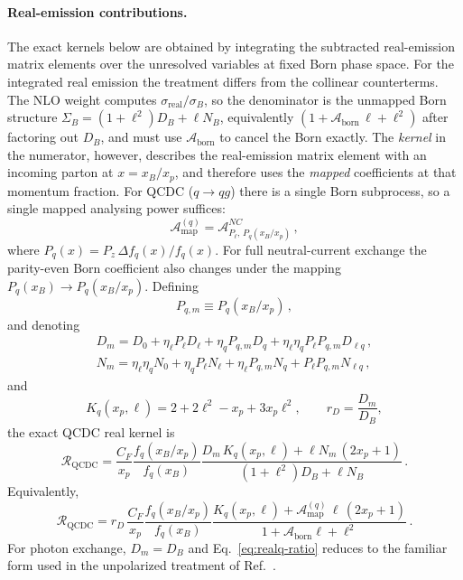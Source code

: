 \documentclass[a4paper,11pt]{article}
\begin{document}
\paragraph{Real-emission contributions.}
The exact kernels below are obtained by integrating the subtracted real-emission matrix elements over the unresolved variables at fixed Born phase space. For the integrated real emission the treatment differs from the collinear counterterms.  The NLO weight computes $\sigma_{\text{real}}/\sigma_B$, so the denominator is the unmapped Born structure $\Sigma_B=(1+\ell^2)D_B+\ell N_B$, equivalently $(1+\mathcal{A}_{\text{born}}\,\ell+\ell^2)$ after factoring out $D_B$, and must use $\mathcal{A}_{\text{born}}$ to cancel the Born exactly.  The \emph{kernel} in the numerator, however, describes the real-emission matrix element with an incoming parton at $x=x_B/x_p$, and therefore uses the \emph{mapped} coefficients at that momentum fraction.  For QCDC ($q\to qg$) there is a single Born subprocess, so a single mapped analysing power suffices:
\begin{equation}
  \mathcal{A}_{\text{map}}^{(q)} = \mathcal{A}^{NC}_{P_\ell,\,P_q(x_B/x_p)}\,,
\label{eq:a-mapped-q}
\end{equation}
where $P_q(x)=P_z\,\Delta f_q(x)/f_q(x)$.
For full neutral-current exchange the parity-even Born coefficient also changes under the mapping $P_q(x_B)\to P_q(x_B/x_p)$. Defining
\begin{equation}
  P_{q,m}\equiv P_q(x_B/x_p)\,,
\end{equation}
and denoting
\begin{align}
  D_m=D_0+\eta_\ell P_\ell D_\ell+\eta_q P_{q,m}D_q+\eta_\ell\eta_q P_\ell P_{q,m}D_{\ell q}\,,\nonumber \\
  N_m=\eta_\ell\eta_q N_0+\eta_q P_\ell N_\ell+\eta_\ell P_{q,m}N_q+P_\ell P_{q,m}N_{\ell q}\,,
\end{align}
and
\begin{equation}
  K_q(x_p,\ell)=2+2\ell^2-x_p+3x_p\ell^2,\qquad
  r_D=\frac{D_m}{D_B},
\end{equation}
the exact QCDC real kernel is
\begin{equation}
  \mathcal{R}_{\text{QCDC}}
  =
  \frac{C_F}{x_p}\frac{f_q(x_B/x_p)}{f_q(x_B)}
  \frac{D_m\,K_q(x_p,\ell)+\ell N_m\,(2x_p+1)}
       {(1+\ell^2)D_B+\ell N_B}\,.
  \label{eq:realq-exact}
\end{equation}
Equivalently,
\begin{equation}
  \mathcal{R}_{\text{QCDC}}
  =
  r_D\,
  \frac{C_F}{x_p}\frac{f_q(x_B/x_p)}{f_q(x_B)}
  \frac{K_q(x_p,\ell)+\mathcal{A}_{\text{map}}^{(q)}\,\ell\,(2x_p+1)}
       {1+\mathcal{A}_{\text{born}}\ell+\ell^2}\,.
  \label{eq:realq-ratio}
\end{equation}
For photon exchange, $D_m=D_B$ and Eq.~\eqref{eq:realq-ratio} reduces to the familiar form used in the unpolarized treatment of Ref.~\cite{DErrico:2011wfa}.
\end{document}
